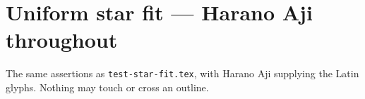 \documentclass{jlreq}
\begin{document}
\section*{Uniform star fit --- Harano Aji throughout}

\KKSfitsuite

\noindent The same assertions as \texttt{test-star-fit.tex}, with Harano Aji
supplying the Latin glyphs.  Nothing may touch or cross an outline.\par
\medskip
{\Huge{}}
\end{document}
